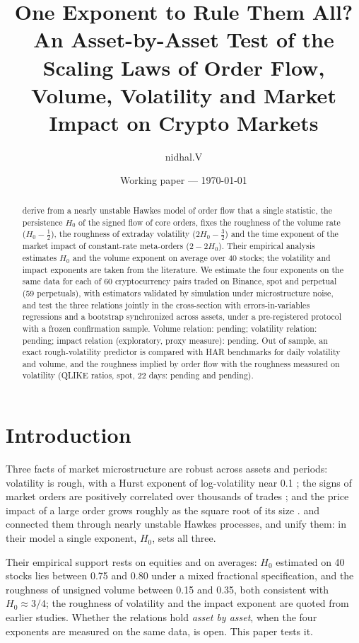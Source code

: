 \documentclass[11pt]{article}
\title{One Exponent to Rule Them All? An Asset-by-Asset Test of the Scaling Laws of
Order Flow, Volume, Volatility and Market Impact on Crypto Markets}
\author{nidhal.V}
\date{Working paper --- \today}
\newcommand{\Hz}{H_0}
\providecommand{\resultHOneBoth}{pending}
\providecommand{\resultHTwoBoth}{pending}
\providecommand{\resultHThreeBoth}{pending}
\providecommand{\nPairs}{60}
\providecommand{\nPerps}{59}
\providecommand{\resultFOne}{pending}
\providecommand{\resultFTwo}{pending}
\begin{document}
\maketitle

\begin{abstract}
\citet{mocrs2026} derive from a nearly unstable Hawkes model of order flow that a single
statistic, the persistence $\Hz$ of the signed flow of core orders, fixes the roughness of
the volume rate ($\Hz-\tfrac12$), the roughness of extraday volatility ($2\Hz-\tfrac32$) and
the time exponent of the market impact of constant-rate meta-orders ($2-2\Hz$). Their
empirical analysis estimates $\Hz$ and the volume exponent on average over 40 stocks; the
volatility and impact exponents are taken from the literature. We estimate the four
exponents on the same data for each of \nPairs{} cryptocurrency pairs traded on Binance,
spot and perpetual (\nPerps{} perpetuals), with estimators validated by simulation under
microstructure noise, and test the three relations jointly in the cross-section with
errors-in-variables regressions and a bootstrap synchronized across assets, under a
pre-registered protocol with a frozen confirmation sample. Volume relation: \resultHOneBoth;
volatility relation: \resultHTwoBoth; impact relation (exploratory, proxy measure):
\resultHThreeBoth. Out of sample, an exact rough-volatility predictor is compared with HAR
benchmarks for daily volatility and volume, and the roughness implied by order flow with
the roughness measured on volatility (QLIKE ratios, spot, 22 days: \resultFOne{} and
\resultFTwo).
\end{abstract}

\section{Introduction}
Three facts of market microstructure are robust across assets and periods: volatility is
rough, with a Hurst exponent of log-volatility near 0.1 \citep{gatheral2018}; the signs of
market orders are positively correlated over thousands of trades
\citep{lillo2004,bouchaud2004}; and the price impact of a large order grows roughly as the
square root of its size \citep{toth2011}. \citet{eleuch2018} and \citet{jusselin2020}
connected them through nearly unstable Hawkes processes, and \citet{mocrs2026} unify them:
in their model a single exponent, $\Hz$, sets all three.

Their empirical support rests on equities and on averages: $\Hz$ estimated on 40 stocks
lies between 0.75 and 0.80 under a mixed fractional specification, and the roughness of
unsigned volume between 0.15 and 0.35, both consistent with $\Hz\approx 3/4$; the
roughness of volatility and the impact exponent are quoted from earlier studies. Whether
the relations hold \emph{asset by asset}, when the four exponents are measured on the same
data, is open. This paper tests it.
\end{document}
